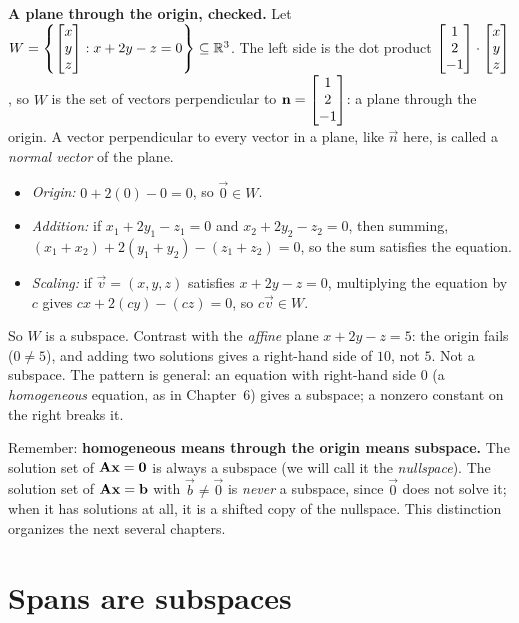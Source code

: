 \begin{example}\label{ch11:plane-subspace}
\textbf{A plane through the origin, checked.} Let
$W = \left\{ \begin{bmatrix}x\\y\\z\end{bmatrix} : x + 2y - z = 0 \right\}\subseteq\mathbb{R}^3$. The left side is the
dot product $\begin{bmatrix}1\\2\\-1\end{bmatrix}\cdot\begin{bmatrix}x\\y\\z\end{bmatrix}$, so $W$ is the set of vectors
perpendicular to $\mathbf{n}=\begin{bmatrix}1\\2\\-1\end{bmatrix}$: a plane through the origin. A vector
perpendicular to every vector in a plane, like $\vec{n}$ here, is called a \emph{normal
vector} of the plane.
\begin{itemize}
  \item \emph{Origin:} $0 + 2(0) - 0 = 0$, so $\vec{0}\in W$.
  \item \emph{Addition:} if $x_1+2y_1-z_1=0$ and $x_2+2y_2-z_2=0$, then summing,
  $(x_1+x_2)+2(y_1+y_2)-(z_1+z_2)=0$, so the sum satisfies the equation.
  \item \emph{Scaling:} if $\vec{v}=(x,y,z)$ satisfies $x+2y-z=0$, multiplying the
  equation by $c$ gives $cx+2(cy)-(cz)=0$, so $c\vec{v}\in W$.
\end{itemize}
So $W$ is a subspace. Contrast with the \emph{affine} plane $x+2y-z = 5$: the origin fails
($0\ne 5$), and adding two solutions gives a right-hand side of $10$, not $5$. Not a
subspace. The pattern is general: an equation with right-hand side $0$
(a \emph{homogeneous} equation, as in Chapter~6) gives a subspace; a nonzero constant on
the right breaks it.
\end{example}

\begin{focusbox}
Remember: \textbf{homogeneous means through the origin means subspace.} The
solution set of $\mathbf{A}\mathbf{x}=\mathbf{0}$ is always a subspace (we will call it the
\emph{nullspace}). The solution set of $\mathbf{A}\mathbf{x}=\mathbf{b}$ with $\vec{b}\ne\vec{0}$ is
\emph{never} a subspace, since $\vec{0}$ does not solve it; when it has solutions at all,
it is a shifted copy of the nullspace. This distinction organizes the next several chapters.
\end{focusbox}

\section{Spans are subspaces}

